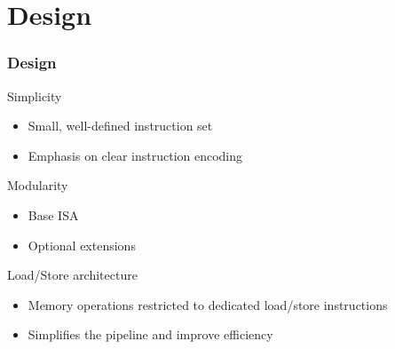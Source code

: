 \documentclass{beamer}
\begin{document}
	\section{Design}
	\begin{frame}
		\frametitle{Design}
		
		\begin{alertblock}{Simplicity}
			\begin{itemize}
				\item Small, well-defined instruction set
				\item Emphasis on clear instruction encoding
			\end{itemize}
		\end{alertblock}
		
		\begin{alertblock}{Modularity}
			\begin{itemize}
				\item Base ISA
				\item Optional extensions
			\end{itemize}
		\end{alertblock}
		
			\begin{alertblock}{Load/Store architecture}
			\begin{itemize}
				\item Memory operations restricted to dedicated load/store instructions
				\item Simplifies the pipeline and improve efficiency
			\end{itemize}
		\end{alertblock}
	\end{frame}
	
\end{document}
